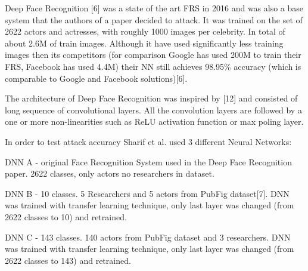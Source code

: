 Deep Face Recognition [6] was a state of the art FRS in 2016 and was also a base system that the authors of a paper decided to attack. It was trained on the set of 2622 actors and actresses, with roughly 1000 images per celebrity. In total of about 2.6M of train images. Although it have used significantly less training images then its competitors (for comparison Google has used 200M to train their FRS, Facebook has used 4.4M) their NN still achieves 98.95\% accuracy (which is comparable to Google and Facebook solutions)[6].

The architecture of Deep Face Recognition was inspired by [12] and consisted of long sequence of convolutional layers. All the convolution layers are followed by a one or more non-linearities such as ReLU activation  function or max poling layer.

In order to test attack accuracy Sharif et al. used 3 different Neural Networks:

DNN A - original Face Recognition System used in the Deep Face Recognition paper. 2622 classes, only actors no researchers in dataset.

DNN B - 10 classes. 5 Researchers and 5 actors from PubFig dataset[7]. DNN was trained with transfer learning technique, only last layer was changed (from 2622 classes to 10) and retrained. 

DNN C - 143 classes. 140 actors from PubFig dataset and 3 researchers. DNN was trained with transfer learning technique, only last layer was changed (from 2622 classes to 143) and retrained.